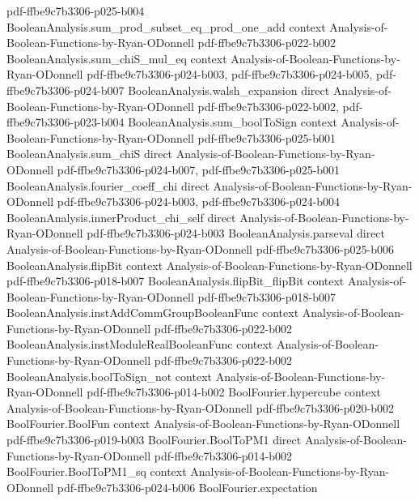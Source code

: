 \begin{lemma}
  {pdf-ffbe9c7b3306-p025-b004}
\proofstep
  {BooleanAnalysis.sum_prod_subset_eq_prod_one_add}
  {context}
  {Analysis-of-Boolean-Functions-by-Ryan-ODonnell}
  {pdf-ffbe9c7b3306-p022-b002}
\proofstep
  {BooleanAnalysis.sum_chiS_mul_eq}
  {context}
  {Analysis-of-Boolean-Functions-by-Ryan-ODonnell}
  {pdf-ffbe9c7b3306-p024-b003,
    pdf-ffbe9c7b3306-p024-b005,
    pdf-ffbe9c7b3306-p024-b007}
\proofstep
  {BooleanAnalysis.walsh_expansion}
  {direct}
  {Analysis-of-Boolean-Functions-by-Ryan-ODonnell}
  {pdf-ffbe9c7b3306-p022-b002,
    pdf-ffbe9c7b3306-p023-b004}
\proofstep
  {BooleanAnalysis.sum_boolToSign}
  {context}
  {Analysis-of-Boolean-Functions-by-Ryan-ODonnell}
  {pdf-ffbe9c7b3306-p025-b001}
\proofstep
  {BooleanAnalysis.sum_chiS}
  {direct}
  {Analysis-of-Boolean-Functions-by-Ryan-ODonnell}
  {pdf-ffbe9c7b3306-p024-b007,
    pdf-ffbe9c7b3306-p025-b001}
\proofstep
  {BooleanAnalysis.fourier_coeff_chi}
  {direct}
  {Analysis-of-Boolean-Functions-by-Ryan-ODonnell}
  {pdf-ffbe9c7b3306-p024-b003,
    pdf-ffbe9c7b3306-p024-b004}
\proofstep
  {BooleanAnalysis.innerProduct_chi_self}
  {direct}
  {Analysis-of-Boolean-Functions-by-Ryan-ODonnell}
  {pdf-ffbe9c7b3306-p024-b003}
\proofstep
  {BooleanAnalysis.parseval}
  {direct}
  {Analysis-of-Boolean-Functions-by-Ryan-ODonnell}
  {pdf-ffbe9c7b3306-p025-b006}
\proofstep
  {BooleanAnalysis.flipBit}
  {context}
  {Analysis-of-Boolean-Functions-by-Ryan-ODonnell}
  {pdf-ffbe9c7b3306-p018-b007}
\proofstep
  {BooleanAnalysis.flipBit_flipBit}
  {context}
  {Analysis-of-Boolean-Functions-by-Ryan-ODonnell}
  {pdf-ffbe9c7b3306-p018-b007}
\proofstep
  {BooleanAnalysis.instAddCommGroupBooleanFunc}
  {context}
  {Analysis-of-Boolean-Functions-by-Ryan-ODonnell}
  {pdf-ffbe9c7b3306-p022-b002}
\proofstep
  {BooleanAnalysis.instModuleRealBooleanFunc}
  {context}
  {Analysis-of-Boolean-Functions-by-Ryan-ODonnell}
  {pdf-ffbe9c7b3306-p022-b002}
\proofstep
  {BooleanAnalysis.boolToSign_not}
  {context}
  {Analysis-of-Boolean-Functions-by-Ryan-ODonnell}
  {pdf-ffbe9c7b3306-p014-b002}
\proofstep
  {BoolFourier.hypercube}
  {context}
  {Analysis-of-Boolean-Functions-by-Ryan-ODonnell}
  {pdf-ffbe9c7b3306-p020-b002}
\proofstep
  {BoolFourier.BoolFun}
  {context}
  {Analysis-of-Boolean-Functions-by-Ryan-ODonnell}
  {pdf-ffbe9c7b3306-p019-b003}
\proofstep
  {BoolFourier.BoolToPM1}
  {direct}
  {Analysis-of-Boolean-Functions-by-Ryan-ODonnell}
  {pdf-ffbe9c7b3306-p014-b002}
\proofstep
  {BoolFourier.BoolToPM1_sq}
  {context}
  {Analysis-of-Boolean-Functions-by-Ryan-ODonnell}
  {pdf-ffbe9c7b3306-p024-b006}
\proofstep
  {BoolFourier.expectation}

\end{lemma}

